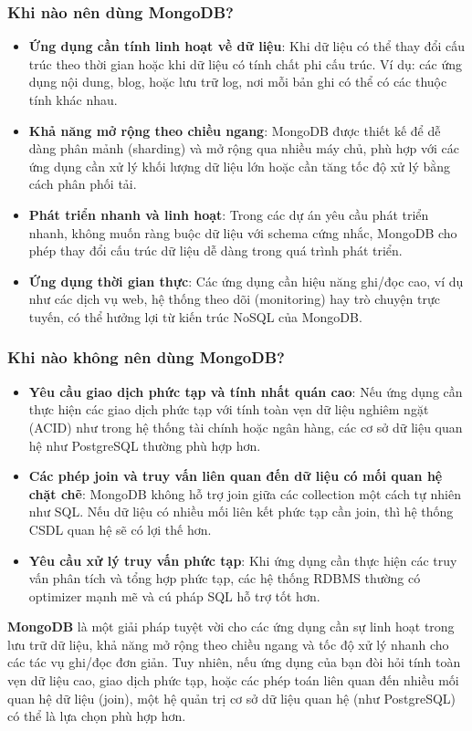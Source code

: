 \subsubsection{Khi nào nên dùng MongoDB?}
\begin{itemize}
    \item \textbf{Ứng dụng cần tính linh hoạt về dữ liệu}: Khi dữ liệu có thể thay đổi cấu trúc theo thời gian hoặc khi dữ liệu có tính chất phi cấu trúc. Ví dụ: các ứng dụng nội dung, blog, hoặc lưu trữ log, nơi mỗi bản ghi có thể có các thuộc tính khác nhau.
    \item \textbf{Khả năng mở rộng theo chiều ngang}: MongoDB được thiết kế để dễ dàng phân mảnh (sharding) và mở rộng qua nhiều máy chủ, phù hợp với các ứng dụng cần xử lý khối lượng dữ liệu lớn hoặc cần tăng tốc độ xử lý bằng cách phân phối tải.
    \item \textbf{Phát triển nhanh và linh hoạt}: Trong các dự án yêu cầu phát triển nhanh, không muốn ràng buộc dữ liệu với schema cứng nhắc, MongoDB cho phép thay đổi cấu trúc dữ liệu dễ dàng trong quá trình phát triển.
    \item \textbf{Ứng dụng thời gian thực}: Các ứng dụng cần hiệu năng ghi/đọc cao, ví dụ như các dịch vụ web, hệ thống theo dõi (monitoring) hay trò chuyện trực tuyến, có thể hưởng lợi từ kiến trúc NoSQL của MongoDB.
\end{itemize}

\subsubsection{Khi nào không nên dùng MongoDB?}

\begin{itemize}
    \item \textbf{Yêu cầu giao dịch phức tạp và tính nhất quán cao}: Nếu ứng dụng cần thực hiện các giao dịch phức tạp với tính toàn vẹn dữ liệu nghiêm ngặt (ACID) như trong hệ thống tài chính hoặc ngân hàng, các cơ sở dữ liệu quan hệ như PostgreSQL thường phù hợp hơn.
    \item \textbf{Các phép join và truy vấn liên quan đến dữ liệu có mối quan hệ chặt chẽ}: MongoDB không hỗ trợ join giữa các collection một cách tự nhiên như SQL. Nếu dữ liệu có nhiều mối liên kết phức tạp cần join, thì hệ thống CSDL quan hệ sẽ có lợi thế hơn.
    \item \textbf{Yêu cầu xử lý truy vấn phức tạp}: Khi ứng dụng cần thực hiện các truy vấn phân tích và tổng hợp phức tạp, các hệ thống RDBMS thường có optimizer mạnh mẽ và cú pháp SQL hỗ trợ tốt hơn.
\end{itemize}

\textbf{MongoDB} là một giải pháp tuyệt vời cho các ứng dụng cần sự linh hoạt trong lưu trữ dữ liệu, khả năng mở rộng theo chiều ngang và tốc độ xử lý nhanh cho các tác vụ ghi/đọc đơn giản. Tuy nhiên, nếu ứng dụng của bạn đòi hỏi tính toàn vẹn dữ liệu cao, giao dịch phức tạp, hoặc các phép toán liên quan đến nhiều mối quan hệ dữ liệu (join), một hệ quản trị cơ sở dữ liệu quan hệ (như PostgreSQL) có thể là lựa chọn phù hợp hơn.